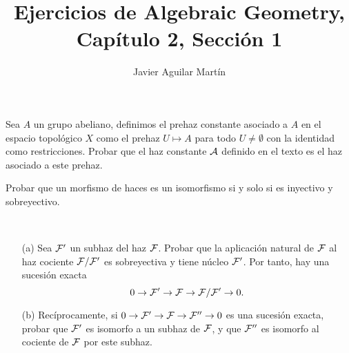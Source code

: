 \documentclass[twoside]{article}
\begin{document}
\title{Ejercicios de Algebraic Geometry, Capítulo 2, Sección 1}
\author{Javier Aguilar Martín}
\maketitle


\begin{ejercicio}{1.1}
Sea $A$ un grupo abeliano, definimos el prehaz constante asociado a $A$ en el espacio topológico $X$ como el prehaz $U\mapsto A$ para todo $U\neq\emptyset$ con la identidad como restricciones. Probar que el haz constante $\mathcal{A}$ definido en el texto es el haz asociado a este prehaz. 
\end{ejercicio}
\begin{solucion}

\end{solucion}

\newpage


\begin{ejercicio}{1.2}

\end{ejercicio}
\begin{solucion}

\end{solucion}

\newpage

\begin{ejercicio}{1.3}


\end{ejercicio}
\begin{solucion}
\end{solucion}

\newpage

\begin{ejercicio}{1.5}
Probar que un morfismo de haces es un isomorfismo si y solo si es inyectivo y sobreyectivo.

\end{ejercicio}
\begin{solucion}

\end{solucion}

\newpage

\begin{ejercicio}{1.6}\
\begin{enumerate}
\item[(a)]
Sea $\mathcal{F}'$ un subhaz del haz $\mathcal{F}$. Probar que la aplicación natural de $\mathcal{F}$ al haz cociente $\mathcal{F}/\mathcal{F}'$ es sobreyectiva y tiene núcleo $\mathcal{F}'$. Por tanto, hay una sucesión exacta 
\[
0\to \mathcal{F}'\to\mathcal{F}\to \mathcal{F}/\mathcal{F}'\to 0.
\]

\item[(b)] Recíprocamente, si $0\to \mathcal{F}'\to\mathcal{F}\to \mathcal{F}''\to 0$ es una sucesión exacta, probar que $\mathcal{F}'$ es isomorfo a un subhaz de $\mathcal{F}$, y que $\mathcal{F}''$ es isomorfo al cociente de $\mathcal{F}$ por este subhaz.
\end{enumerate}
\end{ejercicio}
\begin{solucion}

\end{solucion}
\end{document}
